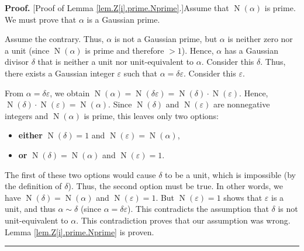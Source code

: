 \documentclass[numbers=enddot,12pt,final,onecolumn,notitlepage]{scrartcl}%
\numberwithin{exer}{subsection}
\theoremstyle{definition}
\newenvironment{proof}[1][Proof]{\noindent\textbf{#1.} }{\ \rule{0.5em}{0.5em}}
\begin{document}
\begin{proof}
[Proof of Lemma \ref{lem.Z[i].prime.Nprime}.]Assume that $\operatorname*{N}%
\left(  \alpha\right)  $ is prime. We must prove that $\alpha$ is a Gaussian prime.

Assume the contrary. Thus, $\alpha$ is not a Gaussian prime, but $\alpha$ is
neither zero nor a unit (since $\operatorname*{N}\left(  \alpha\right)  $ is
prime and therefore $>1$). Hence, $\alpha$ has a Gaussian divisor $\delta$
that is neither a unit nor unit-equivalent to $\alpha$. Consider this $\delta
$. Thus, there exists a Gaussian integer $\varepsilon$ such that
$\alpha=\delta\varepsilon$. Consider this $\varepsilon$.

From $\alpha=\delta\varepsilon$, we obtain $\operatorname*{N}\left(
\alpha\right)  =\operatorname*{N}\left(  \delta\varepsilon\right)
=\operatorname*{N}\left(  \delta\right)  \cdot\operatorname*{N}\left(
\varepsilon\right)  $. Hence, $\operatorname*{N}\left(  \delta\right)
\cdot\operatorname*{N}\left(  \varepsilon\right)  =\operatorname*{N}\left(
\alpha\right)  $. Since $\operatorname*{N}\left(  \delta\right)  $ and
$\operatorname*{N}\left(  \varepsilon\right)  $ are nonnegative integers and
$\operatorname*{N}\left(  \alpha\right)  $ is prime, this leaves only two options:

\begin{itemize}
\item \textbf{either} $\operatorname*{N}\left(  \delta\right)  =1$ and
$\operatorname*{N}\left(  \varepsilon\right)  =\operatorname*{N}\left(
\alpha\right)  $,

\item \textbf{or }$\operatorname*{N}\left(  \delta\right)  =\operatorname*{N}%
\left(  \alpha\right)  $ and $\operatorname*{N}\left(  \varepsilon\right)  =1$.
\end{itemize}

The first of these two options would cause $\delta$ to be a unit, which is
impossible (by the definition of $\delta$). Thus, the second option must be
true. In other words, we have $\operatorname*{N}\left(  \delta\right)
=\operatorname*{N}\left(  \alpha\right)  $ and $\operatorname*{N}\left(
\varepsilon\right)  =1$. But $\operatorname*{N}\left(  \varepsilon\right)  =1$
shows that $\varepsilon$ is a unit, and thus $\alpha\sim\delta$ (since
$\alpha=\delta\varepsilon$). This contradicts the assumption that $\delta$ is
not unit-equivalent to $\alpha$. This contradiction proves that our assumption
was wrong. Lemma \ref{lem.Z[i].prime.Nprime} is proven.
\end{proof}
\end{document}
